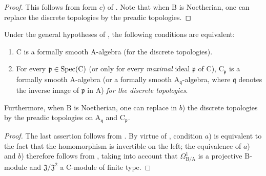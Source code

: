 \begin{proof}
This follows from form $c$) of .
Note that when $\mathrm{B}$ is Noetherian, one can replace the discrete topologies by the preadic topologies.
\end{proof}

\begin{corollary}[22.6.6]
\label{0.22.6.6}
Under the general hypotheses of , the following conditions are equivalent:
\begin{enumerate}
  \item[a)] $\mathrm{C}$ is a formally smooth $\mathrm{A}$-algebra (for the discrete topologies).
  \item[b)] For every $\mathfrak{p}\in\operatorname{Spec}(\mathrm{C})$ (or only for every \emph{maximal} ideal $\mathfrak{p}$ of $\mathrm{C}$), $\mathrm{C}_\mathfrak{p}$ is a formally smooth $\mathrm{A}$-algebra (or a formally smooth $\mathrm{A}_{\mathfrak{q}}$-algebra, where $\mathfrak{q}$ denotes the inverse image of $\mathfrak{p}$ in $\mathrm{A}$) \emph{for the discrete topologies}.
\end{enumerate}
Furthermore, when $\mathrm{B}$ is Noetherian, one can replace in $b$) the discrete topologies by the preadic topologies on $\mathrm{A}_{\mathfrak{q}}$ and $\mathrm{C}_\mathfrak{p}$.
\end{corollary}

\begin{proof}
The last assertion follows from .
By virtue of , condition $a$) is equivalent to the fact that
the homomorphism  is invertible on the left; the equivalence
of $a$) and $b$) therefore follows from , taking into account
that $\Omega^1_{\mathrm{B}/\mathrm{A}}$ is a projective $\mathrm{B}$-module
and $\mathfrak{J}/\mathfrak{J}^2$ a $\mathrm{C}$-module of finite type.
\end{proof}

